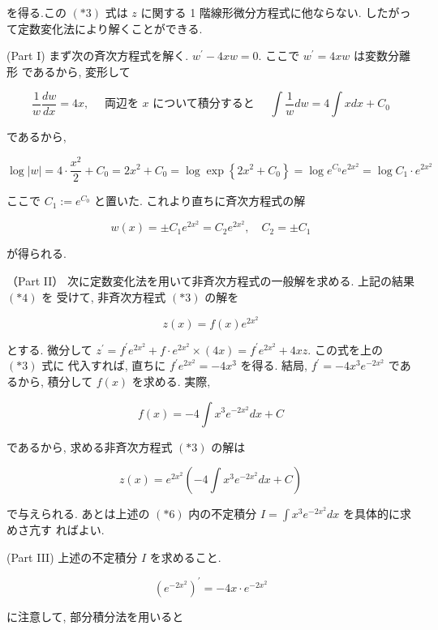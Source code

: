 \documentclass[10pt]{article}
\begin{document}
を得る.この $(* 3)$ 式は $z$ に関する 1 階線形微分方程式に他ならない. したがって定数変化法により解くことができる.

(Part I) まず次の斉次方程式を解く. $w^{\prime}-4 x w=0$. ここで $w^{\prime}=4 x w$ は変数分離形 であるから, 変形して

$$
\frac{1}{w} \frac{d w}{d x}=4 x, \quad \text { 両辺を } x \text { について積分すると } \quad \int \frac{1}{w} d w=4 \int x d x+C_{0}
$$

であるから,

$$
\log |w|=4 \cdot \frac{x^{2}}{2}+C_{0}=2 x^{2}+C_{0}=\log \exp \left\{2 x^{2}+C_{0}\right\}=\log e^{C_{0}} e^{2 x^{2}}=\log C_{1} \cdot e^{2 x^{2}}
$$

ここで $C_{1}:=e^{C_{0}}$ と置いた. これより直ちに斉次方程式の解


\begin{equation*}
w(x)= \pm C_{1} e^{2 x^{2}}=C_{2} e^{2 x^{2}}, \quad C_{2}= \pm C_{1} \tag{*4}
\end{equation*}


が得られる.

（Part II） 次に定数変化法を用いて非斉次方程式の一般解を求める. 上記の結果 $(* 4)$ を 受けて, 非斉次方程式 $(* 3)$ の解を


\begin{equation*}
z(x)=f(x) e^{2 x^{2}} \tag{*5}
\end{equation*}


とする. 微分して $z^{\prime}=f^{\prime} e^{2 x^{2}}+f \cdot e^{2 x^{2}} \times(4 x)=f^{\prime} e^{2 x^{2}}+4 x z$. この式を上の $(* 3)$ 式に 代入すれば, 直ちに $f^{\prime} e^{2 x^{2}}=-4 x^{3}$ を得る. 結局, $f^{\prime}=-4 x^{3} e^{-2 x^{2}}$ であるから, 積分して $f(x)$ を求める. 実際,

$$
f(x)=-4 \int x^{3} e^{-2 x^{2}} d x+C
$$

であるから, 求める非斉次方程式 $(* 3)$ の解は


\begin{equation*}
z(x)=e^{2 x^{2}}\left(-4 \int x^{3} e^{-2 x^{2}} d x+C\right) \tag{*6}
\end{equation*}


で与えられる. あとは上述の $(* 6)$ 内の不定積分 $I=\int x^{3} e^{-2 x^{2}} d x$ を具体的に求めさ亢す ればよい.

(Part III) 上述の不定積分 $I$ を求めること.

$$
\left(e^{-2 x^{2}}\right)^{\prime}=-4 x \cdot e^{-2 x^{2}}
$$

に注意して, 部分積分法を用いると
\end{document}
